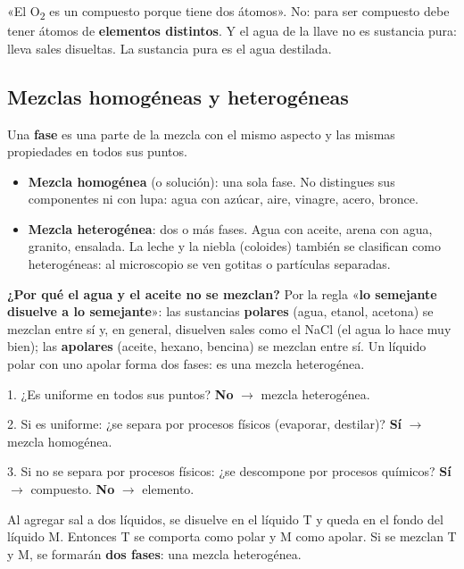 \begin{ojo} «El O\textsubscript{2} es un compuesto porque tiene dos átomos». No: para ser compuesto debe tener átomos de \textbf{elementos distintos}. Y el agua de la llave no es sustancia pura: lleva sales disueltas. La sustancia pura es el agua destilada.\end{ojo}
\subsection{Mezclas homogéneas y heterogéneas}
Una \textbf{fase} es una parte de la mezcla con el mismo aspecto y las mismas propiedades en todos sus puntos.

 
\begin{itemize}
  \item \textbf{Mezcla homogénea} (o solución): una sola fase. No distingues sus componentes ni con lupa: agua con azúcar, aire, vinagre, acero, bronce.
  \item \textbf{Mezcla heterogénea}: dos o más fases. Agua con aceite, arena con agua, granito, ensalada. La leche y la niebla (coloides) también se clasifican como heterogéneas: al microscopio se ven gotitas o partículas separadas.
\end{itemize}
 

\textbf{¿Por qué el agua y el aceite no se mezclan?} Por la regla «\textbf{lo semejante disuelve a lo semejante}»: las sustancias \textbf{polares} (agua, etanol, acetona) se mezclan entre sí y, en general, disuelven sales como el NaCl (el agua lo hace muy bien); las \textbf{apolares} (aceite, hexano, bencina) se mezclan entre sí. Un líquido polar con uno apolar forma dos fases: es una mezcla heterogénea.

  
\begin{clave} 1. ¿Es uniforme en todos sus puntos? \textbf{No} \ensuremath{\rightarrow} mezcla heterogénea.\par 2. Si es uniforme: ¿se separa por procesos físicos (evaporar, destilar)? \textbf{Sí} \ensuremath{\rightarrow} mezcla homogénea.\par 3. Si no se separa por procesos físicos: ¿se descompone por procesos químicos? \textbf{Sí} \ensuremath{\rightarrow} compuesto. \textbf{No} \ensuremath{\rightarrow} elemento.\end{clave}
 
\begin{ejemplo} Al agregar sal a dos líquidos, se disuelve en el líquido T y queda en el fondo del líquido M. Entonces T se comporta como polar y M como apolar. Si se mezclan T y M, se formarán \textbf{dos fases}: una mezcla heterogénea.\end{ejemplo}
 
